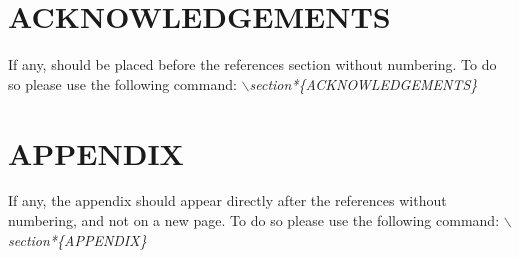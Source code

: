 \documentclass[a4paper,twoside]{article}
\begin{document}
\section*{\uppercase{Acknowledgements}}

\noindent If any, should be placed before the references section
without numbering. To do so please use the following command:
\textit{$\backslash$section*\{ACKNOWLEDGEMENTS\}}


\vfill

{\small
}


\section*{\uppercase{Appendix}}

\noindent If any, the appendix should appear directly after the
references without numbering, and not on a new page. To do so please use the following command:
\textit{$\backslash$section*\{APPENDIX\}}

\vfill
\end{document}
